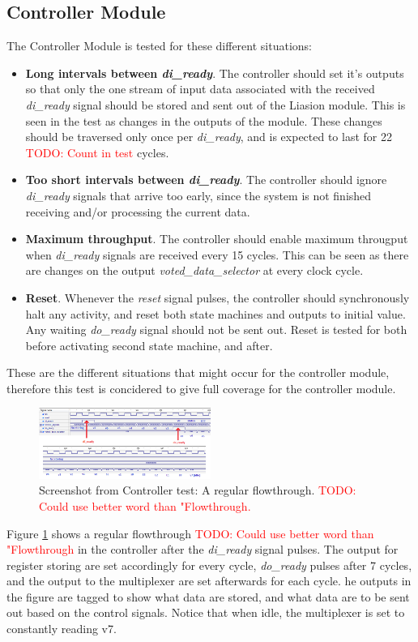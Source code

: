 \documentclass[a4paper]{IEEEtran}
\newcommand\TODO[1]{\textcolor{red}{TODO:#1}}
\newcommand\todo[1]{\TODO{#1}}
\begin{document}
\subsection{ Controller Module}
The Controller Module is tested for these different situations:
\begin{itemize}
    \item \textbf{Long intervals between \textit{di\_ready}}. 
        The controller should set it's outputs so that only the one stream of input data associated with the received \textit{di\_ready} signal should be stored and sent out of the Liasion module.
        This is seen in the test as changes in the outputs of the module.
        These changes should be traversed only once per \textit{di\_ready}, and is expected to last for 22 \todo{ Count in test} cycles.
    \item \textbf{Too short intervals between \textit{di\_ready}}.
        The controller should ignore \textit{di\_ready} signals that arrive too early, since the system is not finished receiving and/or processing the current data.
    \item \textbf{Maximum throughput}.
        The controller should enable maximum througput when \textit{di\_ready} signals are received every 15 cycles.
        This can be seen as there are changes on the output \textit{voted\_data\_selector} at every clock cycle.
    \item \textbf{Reset}.
        Whenever the \textit{reset} signal pulses, the controller should synchronously halt any activity, and reset both state machines and outputs to initial value.
        Any waiting \textit{do\_ready} signal should not be sent out.
        Reset is tested for both before activating second state machine, and after. 
\end{itemize}
These are the different situations that might occur for the controller module, therefore this test is concidered to give full coverage for the controller module.

\begin{figure}[h!]
  \centering
      \includegraphics[width=0.5\textwidth]{Figures/Tests/ControllerRegular}
  \caption{Screenshot from Controller test: A regular flowthrough. \todo{ Could use better word than "Flowthrough.} }
  \label{fig:ControllerRegular}
\end{figure}
Figure \ref{fig:ControllerRegular} shows a regular flowthrough \todo{ Could use better word than "Flowthrough} in the controller after the \textit{di\_ready} signal pulses.
The output for register storing are set accordingly for every cycle, \textit{do\_ready} pulses after 7 cycles, and the output to the multiplexer are set afterwards for each cycle. 
he outputs in the figure are tagged to show what data are stored, and what data are to be sent out based on the control signals.
Notice that when idle, the multiplexer is set to constantly reading v7.
\end{document}
